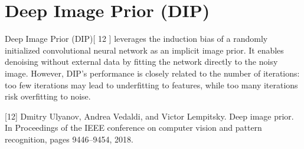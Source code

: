 \chapter{Deep Image Prior (DIP)}

Deep Image Prior (DIP)[ 12 ] leverages the induction bias of a
randomly initialized convolutional neural network as an implicit image
prior. It enables denoising without external data by fitting the
network directly to the noisy image. However, DIP’s performance is
closely related to the number of iterations: too few iterations may
lead to underfitting to features, while too many iterations risk
overfitting to noise. %

[12] Dmitry Ulyanov, Andrea Vedaldi, and Victor Lempitsky. Deep image prior. In Proceedings of the IEEE conference
on computer vision and pattern recognition, pages 9446–9454, 2018.

